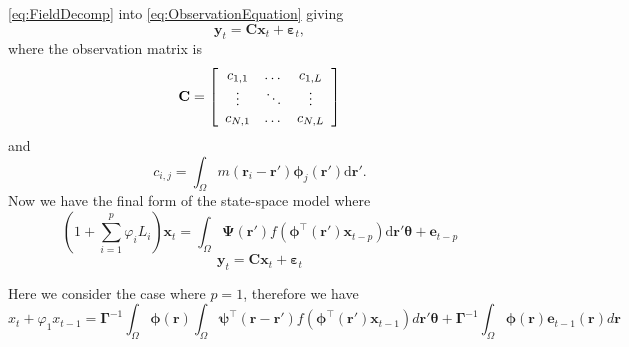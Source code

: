 \documentclass[a4paper,10pt]{article}
\begin{document}
\eqref{eq:FieldDecomp} into \eqref{eq:ObservationEquation} giving
\begin{equation}\label{ObservationEquation} 
	\mathbf{y}_t = \mathbf{C}\mathbf{x}_t + \boldsymbol{\varepsilon}_t,
\end{equation}
where the observation matrix is 
\begin{equation}
	\mathbf{C} = \left[
	\begin{array}{{ccc}} 
		c_{1,1} & \dots & c_{1,L} \\
		\vdots & \ddots & \vdots \\
		c_{N,1} & \dots & c_{N,L} 
	\end{array}
	\right] 
\end{equation}
and 
\begin{equation}
	c_{i,j} = \int_{\Omega}m(\mathbf{r}_i -
\mathbf{r}')\boldsymbol{\phi}_j(\mathbf{r}')\textrm{d}\mathbf{r}'. 
\end{equation}
Now we have the final form of the state-space model where
\begin{equation}\label{eq:finalformstatespacemodel}
	(1+\sum_{i=1}^{p}\varphi_i L_i) \mathbf{x}_t = \int_\Omega
\boldsymbol{\Psi}(\mathbf{r}')
f(\boldsymbol{\phi}^{\top}(\mathbf{r}')\mathbf{x}_{t-p}) \textrm{d}\mathbf{r}'
\boldsymbol{\theta}
 +\mathbf{e}_{t-p}
\end{equation}
\begin{equation} 
	\mathbf{y}_t = \mathbf{C}\mathbf{x}_t + \boldsymbol{\varepsilon}_t
\end{equation}


Here we consider the case where $p=1$, therefore we have
\begin{equation}
x_t+\varphi_{1} x_{t-1}=\boldsymbol\Gamma^{-1}\int_{\Omega}\boldsymbol
\phi(\mathbf
r)\int_{\Omega}\boldsymbol{\psi}^\top\left(\mathbf{r}-\mathbf{r}'\right)
f(\boldsymbol{\phi}^{\top}\left(\mathbf{r'}\right) \mathbf{x}_{t-1})d\mathbf
r'\boldsymbol{\theta}+\boldsymbol\Gamma^{-1}\int_{\Omega}\boldsymbol\phi(\mathbf
r)\mathbf e_{t-1}(\mathbf r)d\mathbf r
\end{equation}
\end{document}
